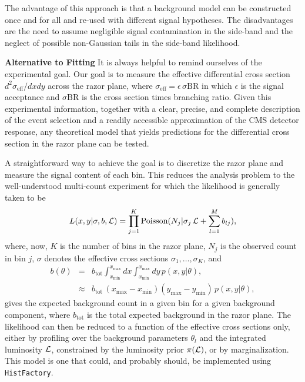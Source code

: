 \documentclass[aps,prd,preprint]{revtex4}
\begin{document}
The advantage of this approach is that a background model can be constructed once and for
all and re-used with different signal hypotheses. The disadvantages are the need to assume
negligible signal contamination in the side-band and the neglect of possible non-Gaussian tails in the side-band likelihood.

\bigskip

\noindent
{\bf \large Alternative to Fitting}
It is always helpful to remind ourselves of the experimental goal. Our goal
is to measure
the effective differential cross section $d^2\sigma_\text{eff}/dx dy$ across the razor plane, where
$\sigma_\text{eff} = \epsilon \, \sigma \text{BR}$ in which $\epsilon$ is the signal acceptance and
$\sigma \text{BR}$ is the cross section times branching ratio. 
Given this experimental information, together with a clear, precise, and complete description of
the event selection and a readily accessible approximation of the CMS detector response, any 
theoretical model that yields predictions for the differential cross section in the razor plane can 
be tested.

A straightforward way to achieve the goal is to discretize the razor plane and measure the signal
content of each bin. This reduces the analysis problem to the well-understood multi-count
experiment for which the likelihood is generally taken to be
\begin{equation}
	L(x, y|\sigma, b, {\cal L}) = \prod_{j=1}^K \text{Poisson}(N_j| \sigma_j \, {\cal L} +  \sum_{l=1}^M b_{lj}),
\end{equation}
where, now, $K$ is the number of bins in the razor plane, $N_j$ is the observed count
in bin $j$, $\sigma$ denotes the effective cross sections $\sigma_1,\ldots,\sigma_K$,  and
\begin{eqnarray}
	b(\theta) & = & b_\text{tot} \int_{x_\text{min}}^{x_\text{max}}  dx \int_{x_\text{min}}^{x_\text{max}} dy  \, p(x, y|\theta), \\ \nonumber
	& \approx & b_\text{tot} \, (x_\text{max} - x_\text{min}) (y_\text{max} - y_\text{min}) \, p(x, y|\theta),
\end{eqnarray}
gives the expected background count in a given bin for a given background component,
where $b_\text{tot}$ is the total expected background in the razor plane. The likelihood can
then be reduced to a function of the effective cross sections only, either by profiling over the 
background parameters $\theta_l$ and the integrated luminosity ${\cal L}$, constrained 
by the luminosity prior $\pi({\cal L})$, or by marginalization. This model is one that could, and probably should, be implemented using {\tt HistFactory}.
%
\end{document}
